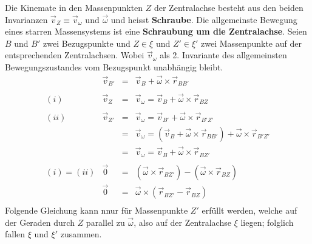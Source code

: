 \newline\newline
Die Kinemate in den Massenpunkten $Z$ der Zentralachse besteht aus den beiden Invarianzen $\overrightarrow{v}_Z\equiv \overrightarrow{v}_{\omega}$ und $\overrightarrow{\omega}$ und heisst \textbf{Schraube}. 
\newline\newline
Die allgemeinste Bewegung eines starren Massensystems ist eine \textbf{Schraubung um die Zentralachse}.
\newline\newline
Seien $B$ und $B'$ zwei Bezugspunkte und $Z\in \xi$ und $Z'\in \xi'$ zwei Massenpunkte auf der entsprechenden Zentralachsen. Wobei $\overrightarrow{v}_{\omega}$ als 2. Invariante des allgemeinsten Bewegungszustandes vom Bezugspunkt unabhängig bleibt. 
\begin{equation}
\boxed{\begin{array}{llll}
&\overrightarrow{v}_{B'}&=&\overrightarrow{v}_B+\overrightarrow{\omega}\times \overrightarrow{r}_{BB'}\\\\
(i)&\overrightarrow{v}_Z&=&\overrightarrow{v}_{\omega}=\overrightarrow{v}_B+\overrightarrow{\omega}\times \overrightarrow{r}_{BZ}\\\\
(ii)&\overrightarrow{v}_{Z'}&=&\overrightarrow{v}_{\omega}=\overrightarrow{v}_{B'}+\overrightarrow{\omega}\times \overrightarrow{r}_{B'Z'}\\
&&=&\overrightarrow{v}_{\omega}=\left(\overrightarrow{v}_B+\overrightarrow{\omega}\times \overrightarrow{r}_{BB'}\right)+\overrightarrow{\omega}\times \overrightarrow{r}_{B'Z'}\\
&&=&\overrightarrow{v}_{\omega}=\overrightarrow{v}_{B}+\overrightarrow{\omega}\times \overrightarrow{r}_{BZ'}\\\\
(i)=(ii)&\overrightarrow{0}&=&\left(\overrightarrow{\omega}\times \overrightarrow{r}_{BZ'}\right)-\left(\overrightarrow{\omega}\times \overrightarrow{r}_{BZ}\right)\\
&\overrightarrow{0}&=&\overrightarrow{\omega}\times \left(\overrightarrow{r}_{BZ'}-\overrightarrow{r}_{BZ}\right)\\
\end{array}}
\end{equation}
Folgende Gleichung kann nnur für Massenpunkte $Z'$ erfüllt werden, welche auf der Geraden durch $Z$ parallel zu $\overrightarrow{\omega}$, also auf der Zentralachse $\xi$ liegen; folglich fallen $\xi$ und $\xi'$ zusammen.
